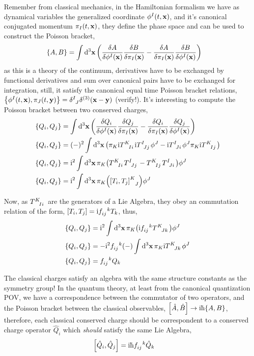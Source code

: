 Remember from classical mechanics, in the Hamiltonian formalism we have as dynamical variables the generalized coordinate $\phi^I(t,\vb x)$, and it's 
canonical conjugated momentum $\pi_I(t,\vb x)$, they define the phase space and can be used to construct the Poisson bracket,
\begin{align}
    \acomm{A}{B}&=\int\dd[3]{\vb x}\qty(\fdv{A}{\phi^I\qty(\vb x)}\fdv{B}{\pi_I\qty(\vb x)}-\fdv{A}{\pi_I\qty(\vb x)}\fdv{B}{\phi^I\qty(\vb x)})
\end{align}
as this is a theory of the continuum, derivatives have to be exchanged by functional derivatives and sum over canonical pairs have to be exchanged 
for integration, still, it satisfy the canonical equal time Poisson bracket relations, $\acomm{\phi^I(t,\vb x)}{\pi_J(t,\vb y)} = \tensor{\delta}{^I_J}\delta^{(3)}\qty(\vb x-\vb y)$ 
(verify!). It's interesting to compute the Poisson bracket between two conserved charges,
\begin{align}
    \acomm{Q_i}{Q_j}&=\int\dd[3]{\vb x}\qty(\fdv{Q_i}{\phi^I\qty(\vb x)}\fdv{Q_j}{\pi_I\qty(\vb x)}-\fdv{Q_i}{\pi_I\qty(\vb x)}\fdv{Q_j}{\phi^I\qty(\vb x)})\\
    \acomm{Q_i}{Q_j}&=(-)^2\int\dd[3]{\vb x}\qty(\pi_K\im\tensor{T}{^K_I_i}\im\tensor{T}{^I_J_j}\phi^J-\im\tensor{T}{^I_J_i}\phi^J\pi_K\im\tensor{T}{^K_I_j})\\
    \acomm{Q_i}{Q_j}&=\im^2\int\dd[3]{\vb x}\pi_K\qty(\tensor{T}{^K_I_i}\tensor{T}{^I_J_j}-\tensor{T}{^K_I_j}\tensor{T}{^I_J_i})\phi^J\\
    \acomm{Q_i}{Q_j}&=\im^2\int\dd[3]{\vb x}\pi_K\qty(\tensor{\comm{T_i}{T_j}}{^K_J})\phi^J
\end{align}

Now, as $\tensor{T}{^K_I_i}$ are the generators of a Lie Algebra, they obey an commutation relation of the form, $\comm{T_i}{T_j} = \im \tensor{f}{_i_j^k}T_k$, 
thus,
\begin{align}
    \acomm{Q_i}{Q_j}&=\im^2\int\dd[3]{\vb x}\pi_K\qty(\im \tensor{f}{_i_j^k}\tensor{T}{^K_J_k} )\phi^J\\
    \acomm{Q_i}{Q_j}&=-\im^2 \tensor{f}{_i_j^k}\qty(-)\int\dd[3]{\vb x}\pi_K\im\tensor{T}{^K_J_k}\phi^J\\
    \acomm{Q_i}{Q_j}&=\tensor{f}{_i_j^k}Q_k
\end{align}

The classical charges satisfy an algebra with the same structure constants as the symmetry group! In the quantum theory, at least from the canonical quantization POV, 
we have a correspondence between the commutator of two operators, and the Poisson bracket between the classical observables, $\comm{\hat A}{\hat B} \rightarrow \im\hbar \acomm{A}{B}$, therefore, 
each classical conserved charge should be correspondent to a conserved charge operator $\hat Q_i$ which \textit{should} 
satisfy the same Lie Algebra,
\begin{align}
    \comm{\hat Q_i}{\hat Q_j}&=\im\hbar \tensor{f}{_i_j^k}\hat Q_k
\end{align}

